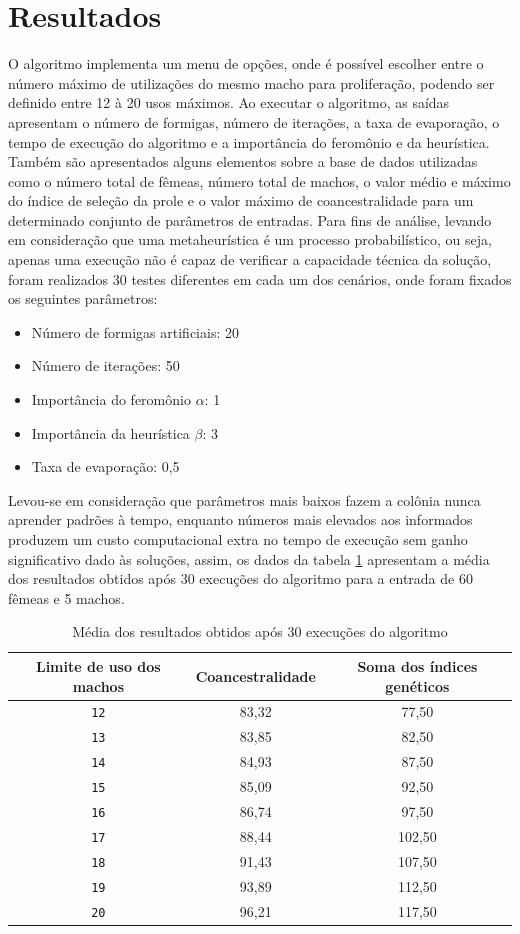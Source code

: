 \section{Resultados}
O algoritmo implementa um menu de opções, onde é possível escolher entre o número máximo de utilizações do mesmo macho para proliferação, podendo ser definido entre 12 à 20 usos máximos. Ao executar o algoritmo, as saídas apresentam o número de formigas, número de iterações, a taxa de evaporação, o tempo de execução do algoritmo e a importância do feromônio e da heurística. Também são apresentados alguns elementos sobre a base de dados utilizadas como o número total de fêmeas, número total de machos, o valor médio e máximo do índice de seleção da prole e o valor máximo de coancestralidade para um determinado conjunto de parâmetros de entradas.
Para fins de análise, levando em consideração que uma metaheurística é um processo probabilístico, ou seja, apenas uma execução não é capaz de verificar a capacidade técnica da solução, foram realizados 30 testes diferentes em cada um dos cenários, onde foram fixados os seguintes parâmetros:
\begin{itemize}
    \item Número de formigas artificiais: 20
    \item Número de iterações: 50
    \item Importância do feromônio \(\alpha\): 1
    \item Importância da heurística \(\beta\): 3
    \item Taxa de evaporação: 0,5
\end{itemize}
Levou-se em consideração que parâmetros mais baixos fazem a colônia nunca aprender padrões à tempo, enquanto números mais elevados aos informados produzem um custo computacional extra no tempo de execução sem ganho significativo dado às soluções, assim, os dados da tabela \ref{resultados_comparativos} apresentam a média dos resultados obtidos após 30 execuções do algoritmo para a entrada de 60 fêmeas e 5 machos.
\begin{center}
\begin{longtable}{|c|c|c|}
\caption{Média dos resultados obtidos após 30 execuções do algoritmo} \label{resultados_comparativos} \\ \hline
\textbf{Limite de uso dos machos} & \textbf{Coancestralidade} & \textbf{Soma dos índices genéticos}\\ \hline
\texttt{12} & 83,32 & 77,50 \\ \hline
\texttt{13} & 83,85 & 82,50  \\ \hline
\texttt{14} & 84,93& 87,50 \\ \hline
\texttt{15} & 85,09 & 92,50 \\ \hline
\texttt{16} & 86,74 & 97,50 \\ \hline
\texttt{17} & 88,44 & 102,50 \\ \hline
\texttt{18} & 91,43 & 107,50 \\ \hline
\texttt{19} & 93,89 & 112,50\\ \hline 
\texttt{20} & 96,21 & 117,50 \\ \hline
\end{longtable}
\end{center}
